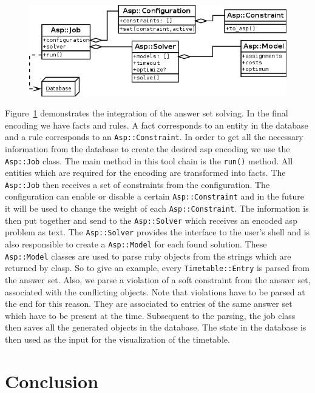 \documentclass[12pt]{article} %
\newcommand{\job}{\texttt{Asp::Job}}
\newcommand{\model}{\texttt{Asp::Model}}
\newcommand{\solver}{\texttt{Asp::Solver}}
\newcommand{\constraint}{\texttt{Asp::Constraint}}
\newcommand{\entry}{\texttt{Timetable::Entry}}
\newcommand{\run}{\texttt{run()}}
\begin{document}
\begin{figure}[h]
    \includegraphics[width=\textwidth]{Images/AspClassDiagram.png}
    \label{fig:class_diagram}
\end{figure}

Figure~\ref{fig:class_diagram} demonstrates the integration of the answer set solving.
In the final encoding we have facts and rules.
A fact corresponds to an entity in the database and a rule corresponds to an \constraint{}.
In order to get all the necessary information from the database to create the desired asp encoding we use the \job{} class.
The main method in this tool chain is the \run{} method.
All entities which are required for the encoding are transformed into facts.
The \job{} then receives a set of constraints from the configuration.
The configuration can enable or disable a certain \constraint{} and in the future it will be used to change the weight of each \constraint{}.
The information is then put together and send to the \solver{} which receives an encoded asp problem as text.
The \solver{} provides the interface to the user's shell and is also responsible to create a \model{} for each found solution.
These \model{} classes are used to parse ruby objects from the strings which are returned by clasp.
So to give an example, every \entry{} is parsed from the answer set.
Also, we parse a violation of a soft constraint from the answer set, associated with the conflicting objects.
Note that violations have to be parsed at the end for this reason.
They are associated to entries of the same answer set which have to be present at the time.
Subsequent to the parsing, the job class then saves all the generated objects in the database.
The state in the database is then used as the input for the visualization of the timetable.

\section{Conclusion}
\end{document}
